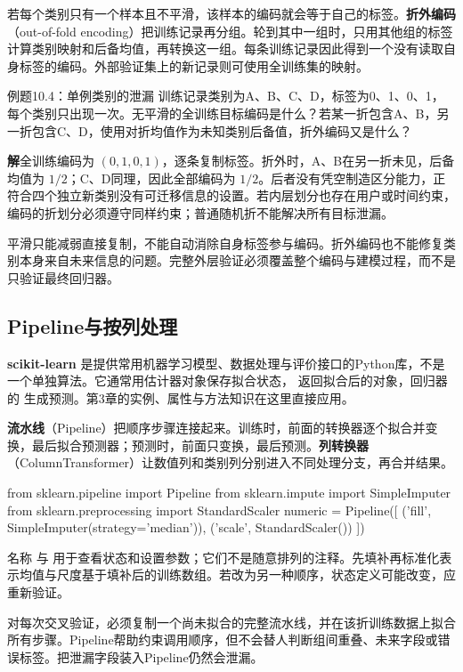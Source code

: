 \documentclass[UTF8,fontset=none,zihao=-4,a4paper]{ctexart}
\newcommand{\term}[1]{\textbf{#1}}
\newcommand{\sol}{\par\noindent\textbf{解}\quad}
\newcommand{\code}[1]{\texttt{\detokenize{#1}}}
\numberwithin{equation}{section}
\numberwithin{figure}{section}
\begin{document}
若每个类别只有一个样本且不平滑，该样本的编码就会等于自己的标签。\term{折外编码}（out-of-fold encoding）把训练记录再分组。轮到其中一组时，只用其他组的标签计算类别映射和后备均值，再转换这一组。每条训练记录因此得到一个没有读取自身标签的编码。外部验证集上的新记录则可使用全训练集的映射。

\begin{infobox}{例题10.4：单例类别的泄漏}
训练记录类别为A、B、C、D，标签为0、1、0、1，每个类别只出现一次。无平滑的全训练目标编码是什么？若某一折包含A、B，另一折包含C、D，使用对折均值作为未知类别后备值，折外编码又是什么？
\end{infobox}
\sol 全训练编码为 $(0,1,0,1)$，逐条复制标签。折外时，A、B在另一折未见，后备均值为 $1/2$；C、D同理，因此全部编码为 $1/2$。后者没有凭空制造区分能力，正符合四个独立新类别没有可迁移信息的设置。若内层划分也存在用户或时间约束，编码的折划分必须遵守同样约束；普通随机折不能解决所有目标泄漏。

平滑只能减弱直接复制，不能自动消除自身标签参与编码。折外编码也不能修复类别本身来自未来信息的问题。完整外层验证必须覆盖整个编码与建模过程，而不是只验证最终回归器。

\subsection{Pipeline与按列处理}
\term{scikit-learn} 是提供常用机器学习模型、数据处理与评价接口的Python库，不是一个单独算法。它通常用估计器对象保存拟合状态，\code{fit} 返回拟合后的对象，回归器的 \code{predict} 生成预测。第3章的实例、属性与方法知识在这里直接应用。

\term{流水线}（Pipeline）把顺序步骤连接起来。训练时，前面的转换器逐个拟合并变换，最后拟合预测器；预测时，前面只变换，最后预测。\term{列转换器}（ColumnTransformer）让数值列和类别列分别进入不同处理分支，再合并结果。
\begin{pycode}
from sklearn.pipeline import Pipeline
from sklearn.impute import SimpleImputer
from sklearn.preprocessing import StandardScaler
numeric = Pipeline([
    ('fill', SimpleImputer(strategy='median')),
    ('scale', StandardScaler())
])
\end{pycode}
名称 \code{fill} 与 \code{scale} 用于查看状态和设置参数；它们不是随意排列的注释。先填补再标准化表示均值与尺度基于填补后的训练数组。若改为另一种顺序，状态定义可能改变，应重新验证。

对每次交叉验证，必须复制一个尚未拟合的完整流水线，并在该折训练数据上拟合所有步骤。Pipeline帮助约束调用顺序，但不会替人判断组间重叠、未来字段或错误标签。把泄漏字段装入Pipeline仍然会泄漏。
\end{document}
